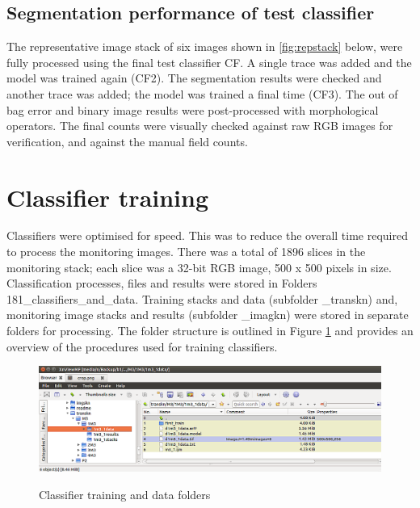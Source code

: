 \subsection{Segmentation performance of test classifier}\label{sec:segmentation-performance-of-test-classifier}
The representative image stack of six images shown in \ref{fig:repstack} below, were fully processed using the final test classifier CF. A single trace was added and the model was trained again (CF2). The segmentation results were checked and another trace was added; the model was trained a final time (CF3). The out of bag error and binary image results were post-processed with morphological operators. The final counts were visually checked against raw \ac{RGB} images for verification, and against the manual field counts. 


\section{Classifier training}\label{sec:classifier-training}
Classifiers were optimised for speed. This was to reduce the overall time required to process the monitoring images. There was a total of 1896 slices in the monitoring stack; each slice was a 32-bit \ac{RGB} image, 500 x 500 pixels in size. Classification processes, files and results were stored in Folders 181\_classifiers\_and\_data. Training stacks and data (subfolder \_transkn) and, monitoring image stacks and results (subfolder \_imagkn) were stored in separate folders for processing. The folder structure is outlined in Figure \ref{fig:train-folder} and provides an overview of the procedures used for training classifiers. 

\begin{figure}[!htbp]\myfloatalign
\includegraphics[width=1\linewidth]{gfx5/ctest/train-folder} \\
\caption[Classifier training and data folders.]{Classifier training and data folders}\label{fig:train-folder}
\end{figure}

